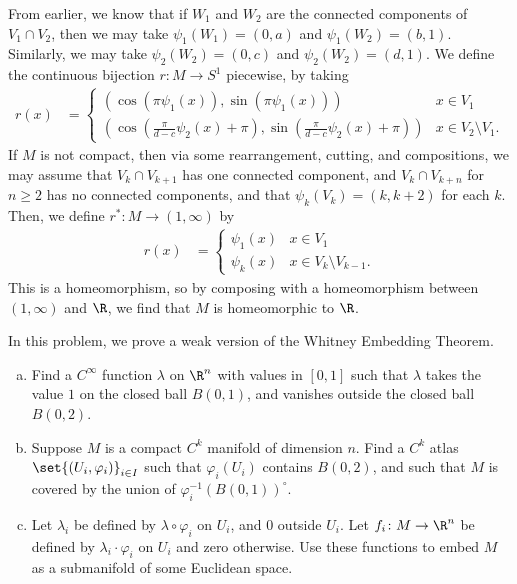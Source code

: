 \documentclass[10pt]{mypackage}
\begin{document}
\begin{solution}
  From earlier, we know that if $W_1$ and $W_2$ are the connected components of $V_1\cap V_2$, then we may take $\psi_1\left( W_1 \right) = (0,a)$ and $\psi_1\left( W_2 \right) = (b,1)$. Similarly, we may take $\psi_2\left( W_2 \right) = (0,c)$ and $\psi_2\left( W_2 \right) = (d,1)$. We define the continuous bijection $r\colon M\rightarrow S^{1}$ piecewise, by taking
  \begin{align*}
    r(x) &= \begin{cases}
      \left( \cos\left( \pi \psi_1(x) \right),\sin\left( \pi\psi_1(x) \right) \right) & x\in V_1\\
      \left( \cos\left( \frac{\pi}{d-c} \psi_2(x) + \pi \right),\sin\left( \frac{\pi}{d-c}\psi_2(x) + \pi \right) \right) & x\in V_2\setminus V_1.
    \end{cases}
  \end{align*}
  If $M$ is not compact, then via some rearrangement, cutting, and compositions, we may assume that $V_k\cap V_{k+1}$ has one connected component, and $V_k\cap V_{k+n}$ for $n\geq 2$ has no connected components, and that $\psi_k\left( V_k \right) = (k,k+2)$ for each $k$. Then, we define $r^{\ast}\colon M\rightarrow (1,\infty)$ by
  \begin{align*}
    r(x) &= \begin{cases}
      \psi_1(x) & x\in V_1\\
      \psi_k(x) & x\in V_{k}\setminus V_{k-1}.
    \end{cases}
  \end{align*}
  This is a homeomorphism, so by composing with a homeomorphism between $\left( 1,\infty \right)$ and $\R$, we find that $M$ is homeomorphic to $\R$.
\end{solution}
\begin{problem}[Problem 5]
  In this problem, we prove a weak version of the Whitney Embedding Theorem.
  \begin{enumerate}[(a)]
    \item Find a $C^{\infty}$ function $\lambda$ on $\R^{n}$ with values in $[0,1]$ such that $\lambda$ takes the value $1$ on the closed ball $B\left( 0,1 \right)$, and vanishes outside the closed ball $B\left( 0,2 \right)$.
    \item Suppose $M$ is a compact $C^{k}$ manifold of dimension $n$. Find a $C^{k}$ atlas $\set{\left( U_i,\varphi_i \right)}_{i\in I}$ such that $\varphi_i\left( U_i \right)$ contains $B\left( 0,2 \right)$, and such that $M$ is covered by the union of $\varphi_i^{-1}\left( B\left( 0,1 \right) \right)^{\circ}$.
    \item Let $\lambda_i$ be defined by $\lambda\circ\varphi_i$ on $U_i$, and $0$ outside $U_i$. Let $f_i\colon M\rightarrow \R^n$ be defined by $\lambda_i\cdot\varphi_i$ on $U_i$ and zero otherwise. Use these functions to embed $M$ as a submanifold of some Euclidean space.
  \end{enumerate}
\end{problem}
\end{document}
